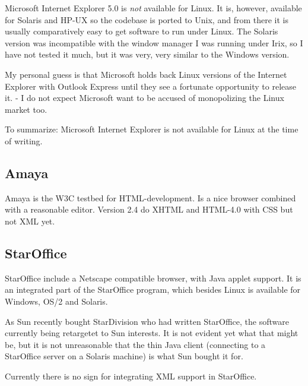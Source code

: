Microsoft Internet Explorer 5.0 is \textit{not} available for Linux.
It is, however, available for Solaris and HP-UX so the codebase is
ported to Unix, and from there it is usually comparatively easy to get
software to run under Linux.  The Solaris version was incompatible
with the window manager I was running under Irix, so I have not tested
it much, but it was very, very similar to the Windows version.

My personal guess is that Microsoft holds back Linux versions of the
Internet Explorer with Outlook Express until they see a fortunate
opportunity to release it.   - I do not expect Microsoft want to
be accused of monopolizing the Linux market too.

To summarize:  Microsoft Internet Explorer is not available for Linux
at the time of writing.

\subsection{Amaya}
\label{sec:amaya}

Amaya is the W3C testbed for HTML-development.  Is a nice browser
combined with a reasonable editor.  Version 2.4 do XHTML and HTML-4.0
with CSS but not XML yet.




\subsection{StarOffice}
\label{sec:staroffice}

StarOffice include a Netscape compatible browser, with
Java applet support.  It is an integrated part of the StarOffice
program, which besides Linux is available for Windows, OS/2 and
Solaris.

As Sun recently bought StarDivision who had written StarOffice, the
software currently being retargetet to Sun interests.  It is not
evident yet what that might be, but it is not unreasonable that the
thin Java client (connecting to a StarOffice server on a Solaris
machine) is what Sun bought it for.

Currently there is no sign for integrating XML support in StarOffice.

